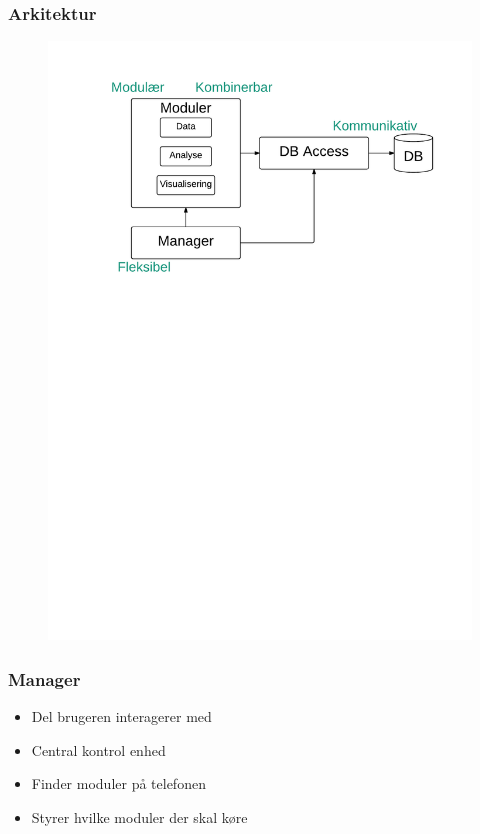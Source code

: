 \begin{frame}
\frametitle{Arkitektur}
\begin{figure}[h]
	\centering						%
	\includegraphics[scale=0.5, trim = 1cm 17.5cm 1cm 1cm, clip]{../graphics/ArkitekturMedKriterier}
\end{figure}
\end{frame}

\begin{frame}
\frametitle{Manager}
\begin{itemize}
\item Del brugeren interagerer med
\item Central kontrol enhed
\item Finder moduler på telefonen
\item Styrer hvilke moduler der skal køre
\end{itemize}
\end{frame}

